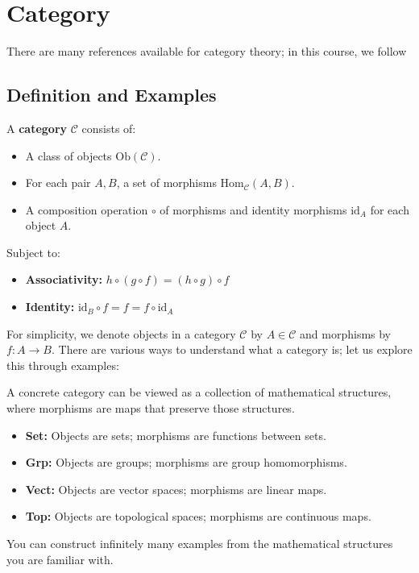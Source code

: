 \chapter{Category}\label{chap:category} 

There are many references available for category theory; in this course, we follow \cite{nlab:geometry_of_physics_--_categories_and_toposes}
\section{Definition and Examples}
\begin{definition}[Category]
A \textbf{category} $\mathcal{C}$ consists of:
\begin{itemize}
  \item A class of objects $\mathrm{Ob}(\mathcal{C})$.
    \item For each pair $A, B$, a set of morphisms $\mathrm{Hom}_{\mathcal{C}}(A, B)$.
    \item A composition operation $\circ$ of morphisms and identity morphisms $\mathrm{id}_A$ for each object $A$.
\end{itemize}

Subject to:
\begin{itemize}
    \item \textbf{Associativity:} $h \circ (g \circ f) = (h \circ g) \circ f$
    \item \textbf{Identity:} $\mathrm{id}_B \circ f = f = f \circ \mathrm{id}_A$
\end{itemize}
 
\end{definition}

For simplicity, we denote objects in a category $\mathcal{C}$ by $A \in \mathcal{C}$ and morphisms by $f: A \to B$. There are various ways to understand what a category is; let us explore this through examples:

\begin{example}
A concrete category can be viewed as a collection of mathematical structures, where morphisms are maps that preserve those structures.
\begin{itemize}
    \item \textbf{Set:} Objects are sets; morphisms are functions between sets.
    \item \textbf{Grp:} Objects are groups; morphisms are group homomorphisms.
    \item \textbf{Vect:} Objects are vector spaces; morphisms are linear maps.
    \item \textbf{Top:} Objects are topological spaces; morphisms are continuous maps.
\end{itemize}
You can construct infinitely many examples from the mathematical structures you are familiar with.
\end{example}

